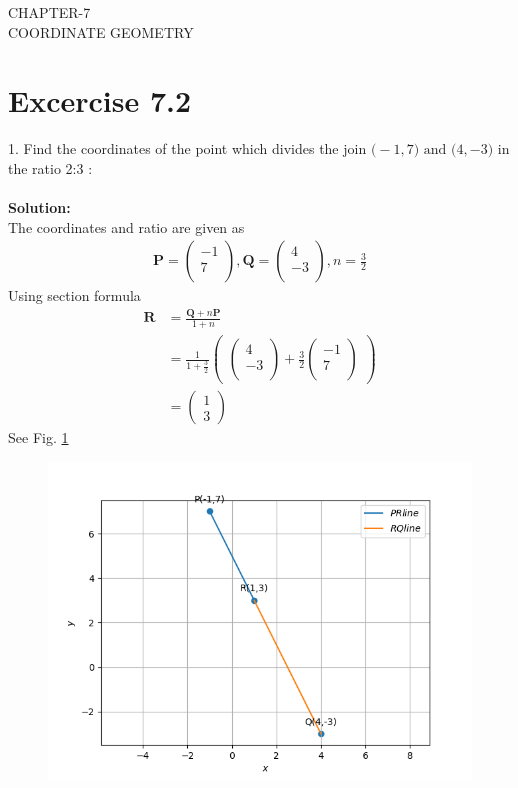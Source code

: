 \documentclass[12pt]{article}
\newcommand{\solution}{\noindent \textbf{Solution: }}
\newcommand{\myvec}[1]{\ensuremath{\begin{pmatrix}#1\end{pmatrix}}}
\let\vec\mathbf
\begin{document}
\begin{center}
\textbf\large{CHAPTER-7 \\ COORDINATE GEOMETRY}
\end{center}
\section*{Excercise 7.2}

1. Find the coordinates of the point which divides the join $\vec(-1,7) \text{ and } \vec(4,-3)$ in the ratio 2:3 :
\\
\\
\solution\\		
\fi
The coordinates and ratio are given as
\begin{align}
\vec{P}=\myvec{-1\\7\\},
\vec{Q}=\myvec{4\\-3\\},
n=\frac{3}{2}
\end{align}
Using section formula
\begin{align}
\vec{R}&=\frac{\vec{Q}+n\vec{P}}{1+n}\\
&=\frac{1}{1+\frac{3}{2}}  \myvec{\myvec{
4\\
-3\\
}
  +
   \frac{3}{2}\myvec{
-1\\
7\\
}}\\
&=\myvec{
1\\
3
}
\end{align}
See Fig. 
\ref{fig:chapters/10/7/2/1/Fig}
\begin{figure}[!h]
\begin{center}
   \includegraphics[width=\columnwidth]{chapters/10/7/2/1/figs/linefig.png}
\end{center}
\caption{}
\label{fig:chapters/10/7/2/1/Fig}
\end{figure}
\end{document}
